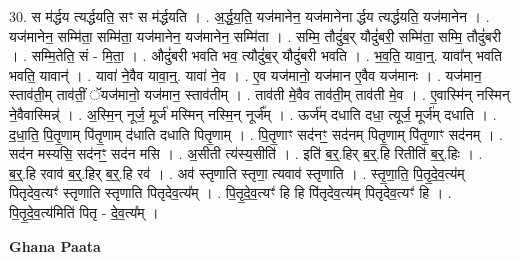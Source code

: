 \documentclass[17pt]{extarticle}
\begin{document}
30. स म॑र्द्धय त्यर्द्धयति॒ सꣳ स म॑र्द्धयति । . अ॒र्द्ध॒य॒ति॒ यज॑मानेन॒ यज॑मानेना र्द्धय त्यर्द्धयति॒ यज॑मानेन । . यज॑मानेन॒ सम्मि॑ता॒ सम्मि॑ता॒ यज॑मानेन॒ यज॑मानेन॒ सम्मि॑ता । . सम्मि॒ तौदुं॑ब॒र् यौदुं॑बरी॒ सम्मि॑ता॒ सम्मि॒ तौदुं॑बरी । . सम्मि॒तेति॒ सं - मि॒ता॒ । . औदुं॑बरी भवति भव॒ त्यौदुं॑ब॒र् यौदुं॑बरी भवति । . भ॒व॒ति॒ यावा॒न्॒. यावा᳚न् भवति भवति॒ यावान्॑ । . यावा॑ ने॒वैव यावा॒न्॒. यावा॑ ने॒व । . ए॒व यज॑मानो॒ यज॑मान ए॒वैव यज॑मानः । . यज॑मान॒ स्ताव॑ती॒म् ताव॑तीं॒ ॅयज॑मानो॒ यज॑मान॒ स्ताव॑तीम् । . ताव॑ती मे॒वैव ताव॑ती॒म् ताव॑ती मे॒व । . ए॒वास्मि॑न् नस्मिन् ने॒वैवास्मिन्न्॑ । . अ॒स्मि॒न् नूर्ज॒ मूर्ज॑ मस्मिन् नस्मि॒न् नूर्ज᳚म् । . ऊर्ज॑म् दधाति दधा॒ त्यूर्ज॒ मूर्ज॑म् दधाति । . द॒धा॒ति॒ पि॒तृ॒णाम् पि॑तृ॒णाम् द॑धाति दधाति पितृ॒णाम् । . पि॒तृ॒णाꣳ सद॑नꣳ॒॒ सद॑नम् पितृ॒णाम् पि॑तृ॒णाꣳ सद॑नम् । . सद॑न मस्यसि॒ सद॑नꣳ॒॒ सद॑न मसि । . अ॒सीती त्य॑स्य॒सीति॑ । . इति॑ ब॒र्॒.हिर् ब॒र्॒.हि रितीति॑ ब॒र्॒.हिः । . ब॒र्॒.हि रवाव॑ ब॒र्॒.हिर् ब॒र्॒.हि रव॑ । . अव॑ स्तृणाति स्तृणा॒ त्यवाव॑ स्तृणाति । . स्तृ॒णा॒ति॒ पि॒तृ॒दे॒व॒त्य॑म् पितृदेव॒त्यꣳ॑ स्तृणाति स्तृणाति पितृदेव॒त्य᳚म् । . पि॒तृ॒दे॒व॒त्यꣳ॑ हि हि पि॑तृदेव॒त्य॑म् पितृदेव॒त्यꣳ॑ हि । . पि॒तृ॒दे॒व॒त्य॑मिति॑ पितृ - दे॒व॒त्य᳚म् । \newline

\textbf{Ghana Paata } \newline
\end{document}

